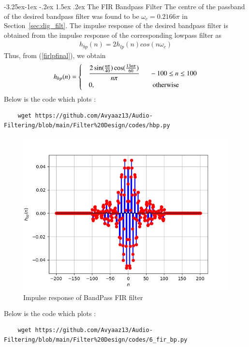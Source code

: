 \documentclass[article]{IEEEtran}
\makeatletter
\theoremstyle{remark}
\newcommand{\secref}[1]{Section~\ref{#1}}
\numberwithin{equation}{subsection}
\renewcommand\subsection{\@startsection{subsection}{2}{\z@}%
    {-3.25ex\@plus -1ex \@minus -.2ex}%
    {1.5ex \@plus .2ex}%
    {\normalfont\large\bfseries}}
\makeatother
\begin{document}
\subsection{The FIR Bandpass Filter}
The centre of the passband of the desired bandpass filter was found to be $\omega_c = 0.2166\pi$ in \secref{sec:dig_filt}.  The impulse response of the desired bandpass filter is obtained from the impulse response of the
corresponding lowpass filter as
\begin{align}
h_{bp}(n) = 2h_{lp}(n)cos(n\omega_c)
\end{align}
Thus, from (\ref{firlpfinal}), we obtain
\begin{align}
h_{bp}(n) =
\begin{cases}
\label{firbpfinal}
& \dfrac{2\sin(\frac{n\pi}{40}) \cos(\frac{13n\pi}{60})}{n\pi} \indent -100 \leq n \leq 100 \nonumber \\
& 0, \hspace{3cm} \mbox{otherwise}
\end{cases}
\end{align}
Below is the code which plots :
\begin{lstlisting}
    wget https://github.com/Avyaaz13/Audio-Filtering/blob/main/Filter%20Design/codes/hbp.py
\end{lstlisting}
\begin{figure}[!ht]
    \centering
    \includegraphics[width = \columnwidth]{figs/hbp.png}
    \caption{Impulse response of BandPass FIR filter}
    \label{hbp}
\end{figure}
Below is the code which plots :
\begin{lstlisting}
    wget https://github.com/Avyaaz13/Audio-Filtering/blob/main/Filter%20Design/codes/6_fir_bp.py
\end{lstlisting}
\end{document}
